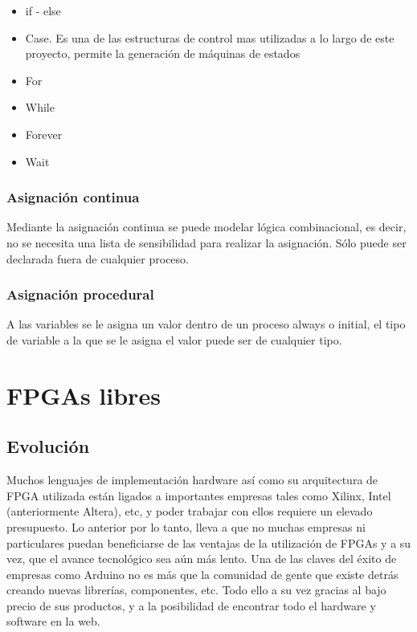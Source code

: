 \begin{itemize}
	\item if - else
	\item Case. Es una de las estructuras de control mas utilizadas a lo largo de este proyecto, permite la generación de máquinas de estados
	\item For
	\item While
	\item Forever
	\item Wait
	
\end{itemize}

\subsubsection{Asignación continua}

Mediante la asignación continua se puede modelar lógica combinacional, es decir, no se necesita una lista de sensibilidad para realizar la asignación. Sólo puede ser declarada fuera de cualquier proceso.

\subsubsection{Asignación procedural}

A las variables se le asigna un valor dentro de un proceso always o initial, el tipo de variable a la que se le asigna el valor puede ser de cualquier tipo.


\section{FPGAs libres}
\subsection{Evolución}
Muchos lenguajes de implementación hardware así como su arquitectura de FPGA utilizada están ligados a importantes empresas tales como Xilinx, Intel (anteriormente Altera), etc, y poder trabajar con ellos requiere un elevado presupuesto. \newline
Lo anterior por lo tanto, lleva a que no muchas empresas ni particulares puedan beneficiarse de las ventajas de la utilización de FPGAs y a su vez, que el avance tecnológico sea aún más lento. Una de las claves del éxito de empresas como Arduino no es más que la comunidad de gente que existe detrás creando nuevas librerías, componentes, etc. Todo ello a su vez gracias al bajo precio de sus productos, y a la posibilidad de encontrar todo el hardware y software en la web. \newline

